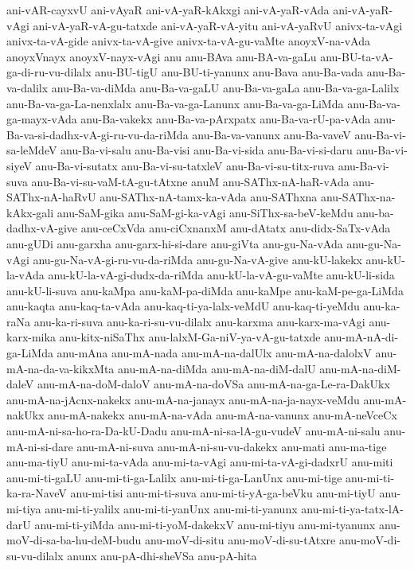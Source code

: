 {ani-vAR-cayxvU
ani-vAyaR
ani-vA-yaR-kAkxgi
ani-vA-yaR-vAda
ani-vA-yaR-vAgi
ani-vA-yaR-vA-gu-tatxde
ani-vA-yaR-vA-yitu
ani-vA-yaRvU
anivx-ta-vAgi
anivx-ta-vA-gide
anivx-ta-vA-give
anivx-ta-vA-gu-vaMte
anoyxV-na-vAda
anoyxVnayx
anoyxV-nayx-vAgi
anu
anu-BAva
anu-BA-va-gaLu
anu-BU-ta-vA-ga-di-ru-vu-dilalx
anu-BU-tigU
anu-BU-ti-yanunx
anu-Bava
anu-Ba-vada
anu-Ba-va-dalilx
anu-Ba-va-diMda
anu-Ba-va-gaLU
anu-Ba-va-gaLa
anu-Ba-va-ga-Lalilx
anu-Ba-va-ga-La-nenxlalx
anu-Ba-va-ga-Lanunx
anu-Ba-va-ga-LiMda
anu-Ba-va-ga-mayx-vAda
anu-Ba-vakekx
anu-Ba-va-pArxpatx
anu-Ba-va-rU-pa-vAda
anu-Ba-va-si-dadhx-vA-gi-ru-vu-da-riMda
anu-Ba-va-vanunx
anu-Ba-vaveV
anu-Ba-vi-sa-leMdeV
anu-Ba-vi-salu
anu-Ba-visi
anu-Ba-vi-sida
anu-Ba-vi-si-daru
anu-Ba-vi-siyeV
anu-Ba-vi-sutatx
anu-Ba-vi-su-tatxleV
anu-Ba-vi-su-titx-ruva
anu-Ba-vi-suva
anu-Ba-vi-su-vaM-tA-gu-tAtxne
anuM
anu-SAThx-nA-haR-vAda
anu-SAThx-nA-haRvU
anu-SAThx-nA-tamx-ka-vAda
anu-SAThxna
anu-SAThx-na-kAkx-gali
anu-SaM-gika
anu-SaM-gi-ka-vAgi
anu-SiThx-sa-beV-keMdu
anu-ba-dadhx-vA-give
anu-ceCxVda
anu-ciCxnanxM
anu-dAtatx
anu-didx-SaTx-vAda
anu-gUDi
anu-garxha
anu-garx-hi-si-dare
anu-giVta
anu-gu-Na-vAda
anu-gu-Na-vAgi
anu-gu-Na-vA-gi-ru-vu-da-riMda
anu-gu-Na-vA-give
anu-kU-lakekx
anu-kU-la-vAda
anu-kU-la-vA-gi-dudx-da-riMda
anu-kU-la-vA-gu-vaMte
anu-kU-li-sida
anu-kU-li-suva
anu-kaMpa
anu-kaM-pa-diMda
anu-kaMpe
anu-kaM-pe-ga-LiMda
anu-kaqta
anu-kaq-ta-vAda
anu-kaq-ti-ya-lalx-veMdU
anu-kaq-ti-yeMdu
anu-ka-raNa
anu-ka-ri-suva
anu-ka-ri-su-vu-dilalx
anu-karxma
anu-karx-ma-vAgi
anu-karx-mika
anu-kitx-niSaThx
anu-lalxM-Ga-niV-ya-vA-gu-tatxde
anu-mA-nA-di-ga-LiMda
anu-mAna
anu-mA-nada
anu-mA-na-dalUlx
anu-mA-na-dalolxV
anu-mA-na-da-va-kikxMta
anu-mA-na-diMda
anu-mA-na-diM-dalU
anu-mA-na-diM-daleV
anu-mA-na-doM-daloV
anu-mA-na-doVSa
anu-mA-na-ga-Le-ra-DakUkx
anu-mA-na-jAcnx-nakekx
anu-mA-na-janayx
anu-mA-na-ja-nayx-veMdu
anu-mA-nakUkx
anu-mA-nakekx
anu-mA-na-vAda
anu-mA-na-vanunx
anu-mA-neVceCx
anu-mA-ni-sa-ho-ra-Da-kU-Dadu
anu-mA-ni-sa-lA-gu-vudeV
anu-mA-ni-salu
anu-mA-ni-si-dare
anu-mA-ni-suva
anu-mA-ni-su-vu-dakekx
anu-mati
anu-ma-tige
anu-ma-tiyU
anu-mi-ta-vAda
anu-mi-ta-vAgi
anu-mi-ta-vA-gi-dadxrU
anu-miti
anu-mi-ti-gaLU
anu-mi-ti-ga-Lalilx
anu-mi-ti-ga-LanUnx
anu-mi-tige
anu-mi-ti-ka-ra-NaveV
anu-mi-tisi
anu-mi-ti-suva
anu-mi-ti-yA-ga-beVku
anu-mi-tiyU
anu-mi-tiya
anu-mi-ti-yalilx
anu-mi-ti-yanUnx
anu-mi-ti-yanunx
anu-mi-ti-ya-tatx-lA-darU
anu-mi-ti-yiMda
anu-mi-ti-yoM-dakekxV
anu-mi-tiyu
anu-mi-tyanunx
anu-moV-di-sa-ba-hu-deM-budu
anu-moV-di-situ
anu-moV-di-su-tAtxre
anu-moV-di-su-vu-dilalx
anunx
anu-pA-dhi-sheVSa
anu-pA-hita
}
